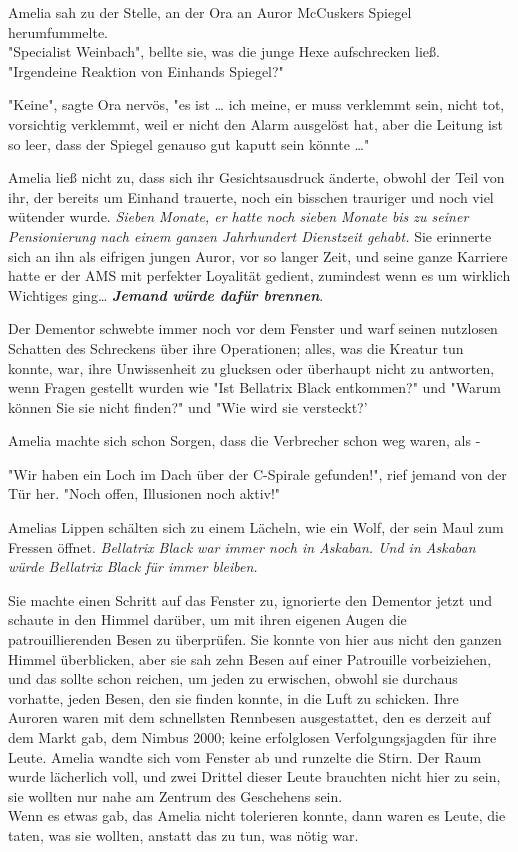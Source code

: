 {Amelia sah zu der Stelle, an der Ora an Auror McCuskers Spiegel herumfummelte.\\ "Specialist Weinbach", bellte sie, was die junge Hexe aufschrecken ließ.\\ "Irgendeine Reaktion von Einhands Spiegel?"

"Keine", sagte Ora nervös, "es ist … ich meine, er muss verklemmt sein, nicht tot, vorsichtig verklemmt, weil er nicht den Alarm ausgelöst hat, aber die Leitung ist so leer, dass der Spiegel genauso gut kaputt sein könnte …"

Amelia ließ nicht zu, dass sich ihr Gesichtsausdruck änderte, obwohl der Teil von ihr, der bereits um Einhand trauerte, noch ein bisschen trauriger und noch viel wütender wurde. \emph{Sieben Monate, er hatte noch sieben Monate bis zu seiner Pensionierung nach einem ganzen Jahrhundert Dienstzeit gehabt.} Sie erinnerte sich an ihn als eifrigen jungen Auror, vor so langer Zeit, und seine ganze Karriere hatte er der AMS mit perfekter Loyalität gedient, zumindest wenn es um wirklich Wichtiges ging… \textbf{\emph{Jemand würde dafür brennen}}.

Der Dementor schwebte immer noch vor dem Fenster und warf seinen nutzlosen Schatten des Schreckens über ihre Operationen; alles, was die Kreatur tun konnte, war, ihre Unwissenheit zu glucksen oder überhaupt nicht zu antworten, wenn Fragen gestellt wurden wie "Ist Bellatrix Black entkommen?" und "Warum können Sie sie nicht finden?" und "Wie wird sie versteckt?'

Amelia machte sich schon Sorgen, dass die Verbrecher schon weg waren, als -

"Wir haben ein Loch im Dach über der C-Spirale gefunden!", rief jemand von der Tür her. "Noch offen, Illusionen noch aktiv!"

Amelias Lippen schälten sich zu einem Lächeln, wie ein Wolf, der sein Maul zum Fressen öffnet. \emph{Bellatrix Black war immer noch in Askaban. Und in Askaban würde Bellatrix Black für immer bleiben.}

Sie machte einen Schritt auf das Fenster zu, ignorierte den Dementor jetzt und schaute in den Himmel darüber, um mit ihren eigenen Augen die patrouillierenden Besen zu überprüfen. Sie konnte von hier aus nicht den ganzen Himmel überblicken, aber sie sah zehn Besen auf einer Patrouille vorbeiziehen, und das sollte schon reichen, um jeden zu erwischen, obwohl sie durchaus vorhatte, jeden Besen, den sie finden konnte, in die Luft zu schicken. Ihre Auroren waren mit dem schnellsten Rennbesen ausgestattet, den es derzeit auf dem Markt gab, dem Nimbus 2000; keine erfolglosen Verfolgungsjagden für ihre Leute. Amelia wandte sich vom Fenster ab und runzelte die Stirn. Der Raum wurde lächerlich voll, und zwei Drittel dieser Leute brauchten nicht hier zu sein, sie wollten nur nahe am Zentrum des Geschehens sein.\\ Wenn es etwas gab, das Amelia nicht tolerieren konnte, dann waren es Leute, die taten, was sie wollten, anstatt das zu tun, was nötig war.

}
